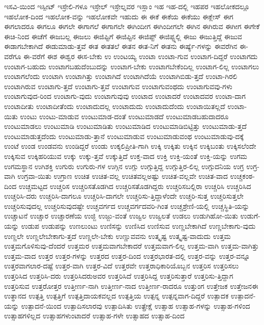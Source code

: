 {ಇಸವಿ-ಯಿಂದ
ಇಸ್ಪೀಟ್
ಇಸ್ರೇಲಿ-ಗಳೂ
ಇಸ್ರೇಲ್
ಇಸ್ರೇಲ್ನವರ
ಇಸ್ಲಾಂ
ಇಹ
ಇಹ-ದಲ್ಲಿ
ಇಹಪರ
ಇಹಲೋಕದಲ್ಲೂ
ಇಹಲೋಕ-ದಿಂದ
ಇಹಲೋಕ-ವನ್ನು
ಇಹಲೋಕವೇ
ಇಹುದು
ಈ
ಈಕೆ
ಈಕೆಯ
ಈಕೆಯು
ಈಕ್ಲೇಸ್
ಈಗ
ಈಗಲಾದರೂ
ಈಗಲೂ
ಈಗಲೇ
ಈಗಾಗಲೆ
ಈಗಾಗಲೇ
ಈಗಿಂದೀಗ
ಈಗಿಂದೀಗಲೇ
ಈಗಿನ
ಈಗಿರುವ
ಈಗೀಗ
ಈಗೇಕೆ
ಈಚಿ-ನಿಂದ
ಈಚೆಗೆ
ಈಜಬಲ್ಲ
ಈಜಲು
ಈಜಿಪ್ಟಿಗೆ
ಈಜಿಪ್ಟಿನ
ಈಜಿಪ್ಟ್
ಈಜಿಪ್ಟ್ನಲ್ಲಿ
ಈಜು
ಈಜುತ್ತಿದ್ದೆ
ಈಜುವ
ಈಡಾಗಬೇಕಾಗಿದೆ
ಈಡುಮಾಡು-ತ್ತವೆ
ಈತ
ಈತತಲೆ
ಈತನ
ಈತ-ನಿಗೆ
ಈತನು
ಈರ್ಷ್ಯೆ-ಗಳನ್ನು
ಈವರೆಗಿನ
ಈ-ವರೆಗೂ
ಈ-ವರೆಗೆ
ಈಶ
ಈಶ್ವರ
ಈಸ-ಬೇಕು
ಉ
ಉಂಟಯ್ಯ
ಉಂಟಾ
ಉಂಟಾ-ಗುವ
ಉಂಟಾಗ-ದಿದ್ದರೆ
ಉಂಟಾಗದು
ಉಂಟಾಗ-ಬಹುದು
ಉಂಟಾಗಬಹುದೆಂಬುದನ್ನು
ಉಂಟಾಗ-ಬೇಕು
ಉಂಟಾಗಬೇಕೆಂದಿಲ್ಲ
ಉಂಟಾಗ-ಲಿಲ್ಲ
ಉಂಟಾಗಲು
ಉಂಟಾಗಲೆಂದು
ಉಂಟಾಗಿ
ಉಂಟಾಗಿತ್ತು
ಉಂಟಾಗಿದೆ
ಉಂಟಾಗಿದೆಯೆ
ಉಂಟಾಗಿಬಿಡು-ತ್ತದೆ
ಉಂಟಾ-ಗಿರಲಿ
ಉಂಟಾಗಿರುವ
ಉಂಟಾಗು-ತ್ತದೆ
ಉಂಟಾಗು-ತ್ತವೆ
ಉಂಟಾಗುವ
ಉಂಟಾಗುವಂಥದು
ಉಂಟಾಗುವವು-ಗಳು
ಉಂಟಾಗುವುದ-ರಿಂದ
ಉಂಟಾಗು-ವುದು
ಉಂಟಾಗುವುವು
ಉಂಟಾದ
ಉಂಟಾದರೆ
ಉಂಟಾದವರ
ಉಂಟಾ-ದಾಗ
ಉಂಟಾದೀತು
ಉಂಟಾದೀತೆಂದು
ಉಂಟಾದುದಲ್ಲ
ಉಂಟಾದುದು
ಉಂಟಾದುದೆಂದು
ಉಂಟಾಯಿತಲ್ಲದೆ
ಉಂಟಾ-ಯಿತು
ಉಂಟು
ಉಂಟು-ಮಾಡುವ
ಉಂಟುಮಾಡ-ದಂತೆ
ಉಂಟುಮಾಡದೆ
ಉಂಟುಮಾಡಬಹುದಾದರೂ
ಉಂಟುಮಾಡಲು
ಉಂಟುಮಾಡಿ
ಉಂಟುಮಾಡಿತು
ಉಂಟುಮಾಡಿದ
ಉಂಟುಮಾಡಿಬಿಟ್ಟಿತ್ತು
ಉಂಟುಮಾಡು-ತ್ತದೆ
ಉಂಟುಮಾಡುತ್ತದೆಂದು
ಉಂಟುಮಾಡು-ತ್ತಾನೆ
ಉಂಟುಮಾಡುವ
ಉಂಟುಮಾಡುವಂಥ
ಉಂಟುಮಾಡುವು-ದಕ್ಕೆ
ಉಂಟೆ
ಉಂಡ
ಉಂಡವನು
ಉಂಡಿದ್ದರೆ
ಉಂಡು
ಉಕ್ಕಲಿಪ್ರೀತಿ-ಗಾಗಿ
ಉಕ್ಕಿ
ಉಕ್ಕಿತು
ಉಕ್ಕಿನ
ಉಕ್ಕಿಬಂತು
ಉಕ್ಕಿಸಲೆಂದೇ
ಉಕ್ಕಿಸುವ
ಉಕ್ಕಿಹರಿಯುವ
ಉಕ್ಕು
ಉಕ್ಕು-ತ್ತವೆ
ಉಕ್ಕುತ್ತಿದೆ
ಉಕ್ತ-ವಾದ
ಉಕ್ತಿ
ಉಕ್ತಿ-ಯಂತೆ
ಉಕ್ತಿ-ಯನ್ನು
ಉಗಮ
ಉಗಮಸ್ಥಾನ
ಉಗಿಶಕ್ತಿ
ಉಗುರು
ಉಗುರು-ಗಳ
ಉಗ್ಗಿನ
ಉಗ್ಗು
ಉಗ್ಗುತ್ತಿದ್ದ
ಉಗ್ಗುತ್ತಿರ-ಲಿಲ್ಲ
ಉಗ್ಗುದನಿಯ
ಉಗ್ರ
ಉಗ್ರ-ವಾಗಿ
ಉಗ್ರವಾ-ಯಿತು
ಉಗ್ರಾಣ
ಉಚಿತ
ಉಚಿತ-ವಲ್ಲ
ಉಚಿತವಲ್ಲಅಷ್ಟು
ಉಚಿತ-ವಲ್ಲವೇ
ಉಚಿತ-ವಾದ
ಉಚ್ಚಕಂಠ-ದಿಂದ
ಉಚ್ಚಮಟ್ಟದ
ಉಚ್ಚರಿಸ
ಉಚ್ಚರಿಸತೊಡಗಿದ
ಉಚ್ಚರಿಸತೊಡಗಿದ್ದರು
ಉಚ್ಚರಿಸಬಲ್ಲಿರಾ
ಉಚ್ಚರಿಸಿ
ಉಚ್ಚರಿಸಿದ
ಉಚ್ಚರಿಸಿ-ದರು
ಉಚ್ಚರಿಸಿ-ದಾಗಲೂ
ಉಚ್ಚರಿಸಿ-ದಾಗಲೇ
ಉಚ್ಚರಿಸು-ತ್ತಿದ್ದಾಳೆಂದೇ
ಉಚ್ಚರಿ-ಸುತ್ತ
ಉಚ್ಚರಿಸುತ್ತಲೇ
ಉಚ್ಚರಿಸುವುದಲ್ಲ
ಉಚ್ಚರಿಸುವುದಷ್ಟೇ
ಉಚ್ಚವರ್ಗದ
ಉಚ್ಚವರ್ಗದವರಿ-ಗಿಂತ
ಉಚ್ಚಶ್ರೇಣಿ-ಯಲ್ಲಿ
ಉಚ್ಚಸ್ಥಿತಿ-ಯನ್ನು
ಉಚ್ಚಾಟನೆ
ಉಚ್ಚಾರ
ಉಚ್ಚಾರಣೆಯ
ಉಜ್ಜಿ
ಉಜ್ಜು-ವಂತೆ
ಉಜ್ವಲ
ಉಜ್ವಲತೆ
ಉಡಲು
ಉಡುಗಿಹೋ-ಯಿತು
ಉಡುಗೆ-ಯನ್ನು
ಉಡುಪ
ಉಡುಪನ್ನು
ಉಣಲುಂಟು
ಉಣಿಸನ್ನು
ಉಣಿಸಿದ
ಉಣಿಸುವ
ಉಣ್ಣಬೇಕಾಗಿದೆ
ಉಣ್ಣಬೇಕಾಗು-ವುದು
ಉಣ್ಣಲೇ
ಉಣ್ಣಲೇಬೇಕಾಗು-ತ್ತದೆ
ಉಣ್ಣಲೇ-ಬೇಕು
ಉಣ್ಣುವವನು
ಉತ್ಕೃಷ್ಟ
ಉತ್ಕೃಷ್ಟ-ವಾದುದು
ಉತ್ತಮ
ಉತ್ತಮಗೊಳಿಸುವು-ದೆಂದರೆ
ಉತ್ತಮರ
ಉತ್ತಮವಾಗಬೇಕಾದರೆ
ಉತ್ತಮವಾಗ-ಲಿಲ್ಲ
ಉತ್ತಮ-ವಾಗಿ
ಉತ್ತಮ-ವಾಗಿತ್ತು
ಉತ್ತಮ-ವಾದ
ಉತ್ತರ
ಉತ್ತರ-ಗಳನ್ನು
ಉತ್ತರದ
ಉತ್ತರ-ದಿಂದ
ಉತ್ತರಭಾರತ-ದಲ್ಲಿ
ಉತ್ತರ-ವನ್ನು
ಉತ್ತರ-ವನ್ನೂ
ಉತ್ತರವಾಗಲಾರ-ದಷ್ಟೆ
ಉತ್ತರ-ವಾಗಿ
ಉತ್ತರ-ವಿದೆ
ಉತ್ತರವೇ
ಉತ್ತರಾಧಿಕಾರಿಯೊಬ್ಬನ
ಉತ್ತರಿಸ
ಉತ್ತರಿಸಲು
ಉತ್ತರಿಸಿದ
ಉತ್ತರಿಸಿ-ದರು
ಉತ್ತರಿಸಿದರುಅವರ
ಉತ್ತರಿಸಿದೆ
ಉತ್ತರಿಸಿದ್ದ
ಉತ್ತರಿಸುತ್ತಾರೆ
ಉತ್ತರಿಸು-ತ್ತಿದ್ದಾಗ
ಉತ್ತರಿಸುವ
ಉತ್ತರೋತ್ತರ
ಉತ್ತೀರ್ಣ-ನಾಗಿ
ಉತ್ತೀರ್ಣ-ನಾದ
ಉತ್ತೀರ್ಣ-ರಾದರೂ
ಉತ್ತುಂಗ
ಉತ್ತೇಜಕ
ಉತ್ತೇಜನಈ
ಉತ್ಥಾನದ
ಉತ್ಪತ್ತಿ
ಉತ್ಪತ್ತಿಗೆ
ಉತ್ಪತ್ತಿದಾಯಕವಲ್ಲದ
ಉತ್ಪತ್ತಿಯ
ಉತ್ಪನ್ನ
ಉತ್ಪನ್ನವಾಗ-ದಿದ್ದರೆ
ಉತ್ಪಾದಕ
ಉತ್ಪಾದನೆ-ಯನ್ನು
ಉತ್ಪಾದನೆ-ಯಿಂದ
ಉತ್ಪಾದಿಸಲಾರವು
ಉತ್ಪಾದಿಸಿತು
ಉತ್ಪ್ರೇಕ್ಷೆ
ಉತ್ಸಾಹ
ಉತ್ಸಾಹ-ಗಳನ್ನು
ಉತ್ಸಾಹ-ಗಳಿಂದ
ಉತ್ಸಾಹಗಳಿಲ್ಲದ
ಉತ್ಸಾಹಗಳುಂಟಾದರೆ
ಉತ್ಸಾಹ-ಗಳೇ
ಉತ್ಸಾಹದ
ಉತ್ಸಾಹ-ದಿಂದ
}
